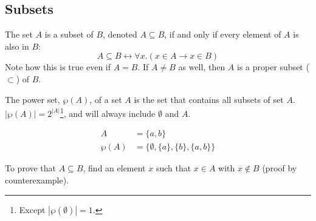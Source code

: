 \subsection{Subsets}
The set \(A\) is a subset of \(B\), denoted \(A \subseteq B\), if and only if every element of \(A\) is also in \(B\):
\begin{equation*}
    \label{eq:subset}
    A \subseteq B \leftrightarrow \forall x. (x \in A \rightarrow x \in B)
\end{equation*}
Note how this is true even if \(A = B\). If \(A \neq B\) as well, then \(A\) is a proper subset (\(\subset\)) of \(B\).

The power set, \(\wp(A)\), of a set \(A\) is the set that contains all subsets of set \(A\). \(|\wp(A)| = 2^{|A|}\)\footnote{Except \(|\wp(\emptyset)| = 1\).}, and will always include \(\emptyset\) and \(A\).
\begin{example}
    \begin{align*}
        A      & = \{a, b\}                              \\
        \wp(A) & = \{\emptyset, \{a\}, \{b\}, \{a, b\}\}
    \end{align*}
\end{example}
To prove that \(A \subseteq B\), find an element \(x\) such that \(x \in A\) with \(x \notin B\) (proof by counterexample).
